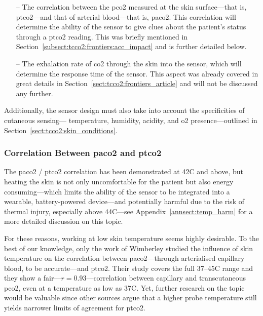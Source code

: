 \begin{enumerate}
	\item[--] The correlation between the \gls{pco2} measured at the skin surface---that is, \gls{ptco2}---and that of arterial blood---that is, \gls{paco2}. This correlation will determine the ability of the sensor to give clues about the patient's status through a \gls{ptco2} reading. This was briefly mentioned in Section~\ref{subsect:tcco2:frontiers:acc_impact} and is further detailed below.
	\item[--] The exhalation rate of \gls{co2} through the skin into the sensor, which will determine the response time of the sensor. This aspect was already covered in great details in Section~\ref{sect:tcco2:frontiers_article} and will not be discussed any further.
\end{enumerate}

Additionally, the sensor design must also take into account the specificities of cutaneous sensing---\ie{} temperature, humidity, acidity, and \gls{o2} presence---outlined in Section~\ref{sect:tcco2:skin_conditions}.

\subsubsection{Correlation Between \texorpdfstring{\gls{paco2}}{paCO2} and \texorpdfstring{\gls{ptco2}}{tcpCO2}}\label{subsect:choos:techno_choice:correl_pa_ptc}

The \gls{paco2} / \gls{ptco2} correlation has been demonstrated at 42{\degree}C and above\cite{conway2018}, but heating the skin is not only uncomfortable for the patient but also energy consuming---which limits the ability of the sensor to be integrated into a wearable, battery-powered device---and potentially harmful due to the risk of thermal injury, especially above 44{\degree}C---see Appendix~\ref{annsect:temp_harm} for a more detailed discussion on this topic.

For these reasons, working at low skin temperature seems highly desirable. To the best of our knowledge, only the work of Wimberley \etal{}\cite{wimberley1985a} studied the influence of skin temperature on the correlation between \gls{paco2}---through arterialised capillary blood, to be accurate---and \gls{ptco2}. Their study covers the full 37--45{\degree}C range and they show a fair---$r=0.93$---correlation between capillary and transcutaneous \gls{pco2}, even at a temperature as low as 37{\degree}C. Yet, \mfrin{}further research on the topic would be valuable since other sources argue that a higher probe temperature still yields narrower limits of agreement for \gls{ptco2}\cite{conway2018}.


